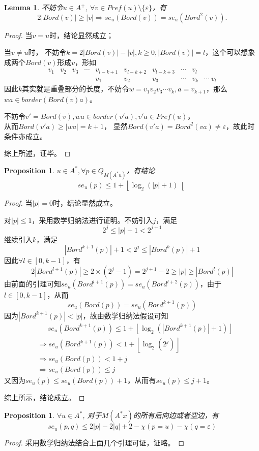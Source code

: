 \documentclass[UTF8]{ctexart}
\newtheorem{lem}[thm]{Lemma}
\newtheorem{prop}[thm]{Proposition}
\theoremstyle{definition}
\theoremstyle{remark}
\numberwithin{equation}{subsection}
\begin{document}
	\begin{lem}
		不妨令$u \in A^+$, $\forall v \in Pref(u) \setminus \{\varepsilon\}$，有
		\[
			2|Bord(v)| \ge |v| \Rightarrow se_u(Bord(v)) = se_u(Bord^2(v)).
		\]
	\end{lem}
	\begin{proof}
		当$v=u$时，结论显然成立；
		
		当$v \neq u$时，
		不妨令$k = 2|Bord(v)| - |v|, k\ge0, |Bord(v)|=l$，这个可以想象成两个$Bord(v)$形成$v$，形如
		\[
			\begin{matrix}
				v_1 & v_2 & v_3  & \cdots & v_{l-k+1} & v_{l-k+2} & v_{l-k+3} & \cdots & v_l  &  \\
					&     &      &        & v_1       & v_2       & v_3       & \cdots & v_k  & \cdots \ v_l
			\end{matrix}
		\]
		因此$k$其实就是重叠部分的长度，不妨令$w = v_1v_2v_3 \cdots v_k, a = v_{k+1}$，那么$wa \in border(Bord(v)a)$。
		
		不妨令$v' = Bord(v), wa \in border(v'a), v'a \in Pref(u)$，\\
		从而$Bord(v'a) \ge |wa| = k+1$，
		显然$Bord(v'a)=Bord^2(va) \neq \varepsilon$，故此时条件亦成立。
		
		综上所述，证毕。
	\end{proof}
	
	\begin{prop}
		$u \in A^*, \forall p \in Q_{M(A^*u)}$，有结论
		\[
			se_u(p) \le 1 + \left\lfloor \log_2(|p|+1) \right\lfloor
		\]
	\end{prop}
	\begin{proof}
		当$|p|=0$时，结论显然成立。
		
		对$|p|\le1$，采用数学归纳法进行证明。不妨引入$j$，满足
		\[
			2^j \le |p| + 1 < 2^{j+1}
		\]
		继续引入$k$，满足
		\[
			|Bord^{k+1}(p)|+1 < 2^j \le |Bord^k(p)|+1
		\]
		因此$\forall l \in [0, k-1]$，有
		\[
			2|Bord^{l+1}(p)| \ge 2 \times (2^j-1) = 2^{j+1}-2 \ge |p| \ge |Bord^l(p)|
		\]
		由前面的引理可知$se_u(Bord^{l+1}(p)) = se_u(Bord^{l+2}(p))$，由于$l \in [0,k-1]$，从而
		\[
			se_u(Bord(p)) = se_u(Bord^{k+1}(p))
		\]
		因为$|Bord^{k+1}(p)| < |p|$，故由数学归纳法假设可知
		\begin{align*}
			&\quad\ \  	se_u(Bord^{k+1}(p)) \le 1 + \left\lfloor \log_2(|Bord^{k+1}(p)|+1) \right\rfloor	\\
			&\Rightarrow 	se_u(Bord^{k+1}(p)) < 1 + \left\lfloor \log_2(2^j) \right\rfloor					\\
			&\Rightarrow	se_u(Bord(p))		< 1 + j	\\
			&\Rightarrow	se_u(Bord(p))		\le j
		\end{align*}
		又因为$se_u(p) \le se_u(Bord(p)) + 1$，从而有$se_u(p) \le j+1$。
		
		综上所示，结论成立。
		
	\end{proof}
	\begin{prop}
		$\forall u \in A^*$, 对于$M(A^*x)$的所有后向边或者空边，有
		\[
			se_u(p, q) \le 2|p| - 2|q| + 2 - \chi(p=u) - \chi(q=\varepsilon)
		\]
	\end{prop}
	\begin{proof}
		采用数学归纳法结合上面几个引理可证，证略。
	\end{proof}
	
\end{document}

